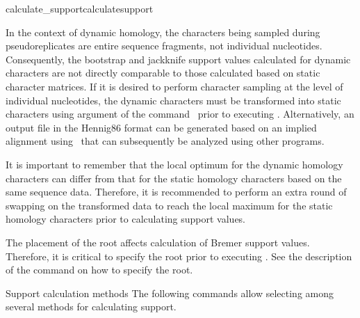\begin{command}{calculate\_support}{calculatesupport}
                   \begin{statement}
                   \setlength{\parindent}{0.5cm}
                In the context of dynamic
                homology, the characters being sampled during pseudoreplicates
                are entire sequence fragments, not individual nucleotides.
                Consequently, the bootstrap and jackknife support values
                calculated for dynamic characters are not directly comparable to
                those calculated based on static character matrices. If it is
                desired to perform character sampling at the level of
                individual nucleotides, the dynamic characters must be
                transformed into static characters using 
                argument of the command~
                prior to executing .
                Alternatively, an output file in the Hennig86 format can be
                generated based on an implied alignment
                using~ that can subsequently be analyzed
                using other programs.
                                
                \indent It is important to remember that the local optimum for the dynamic
                homology characters can differ from that for the static homology characters
                based on the same sequence data. Therefore, it is recommended to perform an extra round of swapping on the
                 transformed data to reach the local maximum for the static
                 homology characters prior to calculating support values.
            \end{statement}
          
      \begin{statement}
  	  The placement of the root affects calculation of Bremer support values.
	  Therefore, it is critical to specify the root prior to executing
	  . See the description of the
	  command  on how to specify the root.
	\end{statement}          
                       
        
              
	\begin{arguments}
		\begin{argumentgroup}{Support calculation methods}
            {The following commands allow selecting among several methods for
            calculating support.} 


\end{argumentgroup}
\end{arguments}
\end{command}
